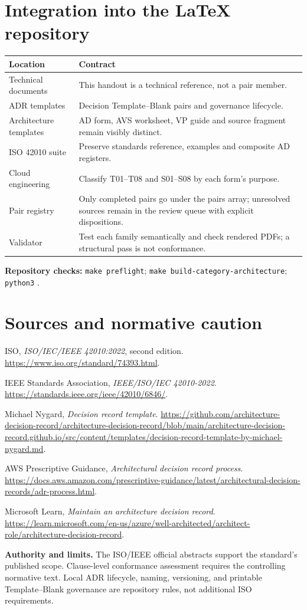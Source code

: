 \documentclass[10pt,letterpaper]{article}
\begin{document}
\section{Integration into the LaTeX repository}
\begin{tabularx}{\linewidth}{@{}L{1.03in}Y@{}}
\toprule
\textbf{Location}&\textbf{Contract}\\
\midrule
Technical documents & This handout is a technical reference, not a pair member.\\
ADR templates & Decision Template--Blank pairs and governance lifecycle.\\
Architecture templates & AD form, AVS worksheet, VP guide and source
fragment remain visibly distinct.\\
ISO 42010 suite & Preserve standards reference, examples and composite AD
registers.\\
Cloud engineering & Classify T01--T08 and S01--S08 by each form's purpose.\\
Pair registry & Only completed pairs go under the pairs array;
unresolved sources remain in the review queue with explicit dispositions.\\
Validator & Test each family semantically and check rendered PDFs;
a structural pass is not conformance.\\
\bottomrule
\end{tabularx}
\textbf{Repository checks:} \texttt{make preflight};
\texttt{make build-category-architecture};
\texttt{python3} .

\section{Sources and normative caution}
\small
\begin{enumerate}[label={[\arabic*]},leftmargin=2em]
\item ISO, \emph{ISO/IEC/IEEE 42010:2022}, second edition.
\url{https://www.iso.org/standard/74393.html}.
\item IEEE Standards Association, \emph{IEEE/ISO/IEC 42010-2022}.
\url{https://standards.ieee.org/ieee/42010/6846/}.
\item Michael Nygard, \emph{Decision record template}.
\url{https://github.com/architecture-decision-record/architecture-decision-record/blob/main/architecture-decision-record.github.io/src/content/templates/decision-record-template-by-michael-nygard.md}.
\item AWS Prescriptive Guidance, \emph{Architectural decision record process}.
\url{https://docs.aws.amazon.com/prescriptive-guidance/latest/architectural-decision-records/adr-process.html}.
\item Microsoft Learn, \emph{Maintain an architecture decision record}.
\url{https://learn.microsoft.com/en-us/azure/well-architected/architect-role/architecture-decision-record}.
\end{enumerate}
\textbf{Authority and limits.} The ISO/IEEE official abstracts support
the standard's published scope. Clause-level conformance assessment
requires the controlling normative text. Local ADR lifecycle, naming,
versioning, and printable Template--Blank governance are
repository rules, not additional ISO requirements.
\end{document}
